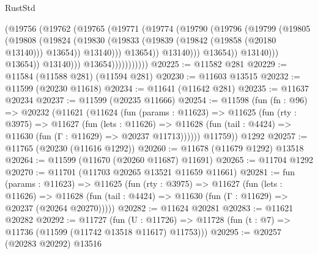 \begin{lexlean}{RustStd}
\begin{coremodule}
                                      (@19756
                                        (@19762
                                          (@19765
                                            (@19771
                                              (@19774
                                                (@19790
                                                  (@19796
                                                    (@19799
                                                      (@19805
                                                        (@19808
                                                          (@19824
                                                            (@19830
                                                              (@19833
                                                                (@19839
                                                                  (@19842 (@19858 (@20180 @13140)))
                                                                  @13654))
                                                              @13140)))
                                                        @13654))
                                                    @13140)))
                                              @13654))
                                          @13140)))
                                    @13654))
                                @13140)))
                          @13654)))))))))))
@20225 := @11582 @281
@20229 := @11584 (@11588 @281) (@11594 @281)
@20230 := @11603 @13515
@20232 := @11599 (@20230 @11618)
@20234 := @11641 (@11642 @281)
@20235 := @11637 @20234
@20237 := @11599 (@20235 @11666)
@20254 := @11598
    (fun (fn : @96) =>
    @20232
      (@11621
        (@11624
          (fun (params : @11623) =>
          @11625
            (fun (rty : @3975) =>
            @11627
              (fun (lets : @11626) =>
              @11628 (fun (tail : @4424) => @11630 (fun (Γ : @11629) => @20237 @11713))))))
        @11759))
    @1292
@20257 := @11765 (@20230 (@11616 @1292))
@20260 := @11678 (@11679 @1292) @13518
@20264 := @11599 (@11670 (@20260 @11687) @11691)
@20265 := @11704 @1292
@20270 := @11701 (@11703 @20265 @13521 @11659 @11661)
@20281 := fun (params : @11623) =>
  @11625
    (fun (rty : @3975) =>
    @11627
      (fun (lets : @11626) =>
      @11628 (fun (tail : @4424) => @11630 (fun (Γ : @11629) => @20237 (@20264 @20270)))))
@20282 := @11624 @20281
@20283 := @11621 @20282
@20292 := @11727
    (fun (U : @11726) => @11728 (fun (t : @7) => @11736 (@11599 (@11742 @13518 @11617) @11753)))
@20295 := @20257 (@20283 @20292) @13516

\end{coremodule}
\end{lexlean}
